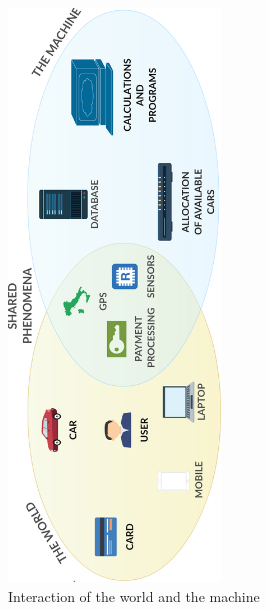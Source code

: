 \begin{figure}[h]
	\centering
	\includegraphics[height=15.2cm,keepaspectratio]{figures/world_and_machine.eps}
	\caption{Interaction of the world and the machine}
	\label{fig:world_and_machine}
\end{figure}